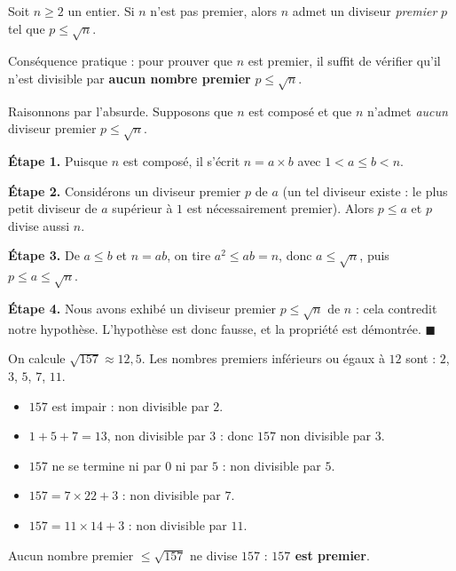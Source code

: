 \documentclass[11pt]{article}
\begin{document}
\begin{propriete}
Soit $n \geq 2$ un entier. Si $n$ n'est pas premier, alors $n$ admet un diviseur \emph{premier} $p$ tel que $p \leq \sqrt{n}$.

Conséquence pratique : pour prouver que $n$ est premier, il suffit de vérifier qu'il n'est divisible par \textbf{aucun nombre premier} $p \leq \sqrt{n}$.
\end{propriete}

\begin{experience}
Raisonnons par l'absurde. Supposons que $n$ est composé et que $n$ n'admet \emph{aucun} diviseur premier $p \leq \sqrt{n}$.

\textbf{Étape 1.} Puisque $n$ est composé, il s'écrit $n = a \times b$ avec $1 < a \leq b < n$.

\textbf{Étape 2.} Considérons un diviseur premier $p$ de $a$ (un tel diviseur existe : le plus petit diviseur de $a$ supérieur à $1$ est nécessairement premier). Alors $p \leq a$ et $p$ divise aussi $n$.

\textbf{Étape 3.} De $a \leq b$ et $n = ab$, on tire $a^2 \leq ab = n$, donc $a \leq \sqrt{n}$, puis $p \leq a \leq \sqrt{n}$.

\textbf{Étape 4.} Nous avons exhibé un diviseur premier $p \leq \sqrt{n}$ de $n$ : cela contredit notre hypothèse. L'hypothèse est donc fausse, et la propriété est démontrée. \hfill$\blacksquare$
\end{experience}

\begin{exemplebox}
On calcule $\sqrt{157} \approx 12,5$. Les nombres premiers inférieurs ou égaux à $12$ sont : $2$, $3$, $5$, $7$, $11$.
\begin{itemize}
\item $157$ est impair : non divisible par $2$.
\item $1+5+7 = 13$, non divisible par $3$ : donc $157$ non divisible par $3$.
\item $157$ ne se termine ni par $0$ ni par $5$ : non divisible par $5$.
\item $157 = 7 \times 22 + 3$ : non divisible par $7$.
\item $157 = 11 \times 14 + 3$ : non divisible par $11$.
\end{itemize}
Aucun nombre premier $\leq \sqrt{157}$ ne divise $157$ : \textbf{$157$ est premier}.
\end{exemplebox}
\end{document}
